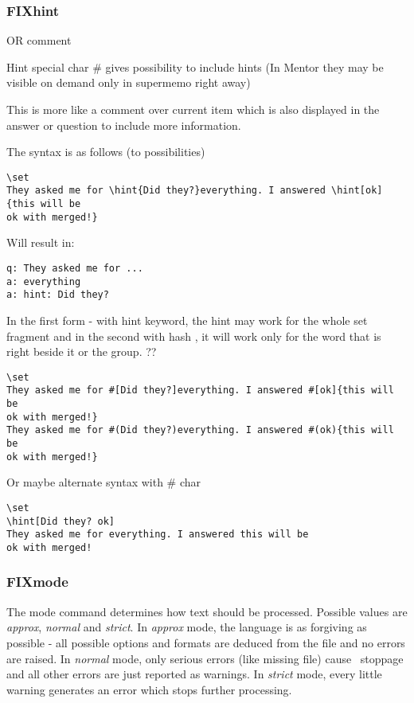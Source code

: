 \documentclass[a4paper,11pt]{article}
\newcommand{\probe}{\emph{\sc{probe{}}}}
\begin{document}
\subsubsection{FIXhint}
OR comment

Hint special char \# gives possibility to include hints (In Mentor they may be
visible on demand only in supermemo right away)

This is more like  a comment over current item which is also displayed in the
answer or question to include more information.



The syntax is as follows (to possibilities)
\begin{verbatim}
\set
They asked me for \hint{Did they?}everything. I answered \hint[ok]{this will be
ok with merged!}
\end{verbatim}
Will result in:

\begin{verbatim}
q: They asked me for ...
a: everything
a: hint: Did they?
\end{verbatim}


In the first form - with hint keyword, the hint may work for the whole set fragment and in the
second with hash , it will work only for  the word that is right beside it or
the group. ??


\begin{verbatim}
\set
They asked me for #[Did they?]everything. I answered #[ok]{this will be
ok with merged!}
They asked me for #(Did they?)everything. I answered #(ok){this will be
ok with merged!}
\end{verbatim}


Or maybe alternate syntax with \# char

\begin{verbatim}
\set
\hint[Did they? ok]
They asked me for everything. I answered this will be
ok with merged!
\end{verbatim}




\subsubsection{FIXmode}
The mode command determines how text should be processed. Possible values are
\textit{approx}, \textit{normal} and \textit{strict}. In \textit{approx} mode,
the language is as forgiving as possible - all possible options and formats are
deduced from the file and no errors are raised.
In \textit{normal} mode, only serious errors (like missing file) cause
\probe\ stoppage and all other errors are just reported as warnings.
In \textit{strict} mode, every little warning generates an error which stops
further processing.
\end{document}
